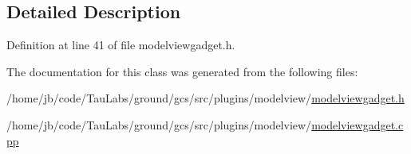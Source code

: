 \subsection{\-Detailed \-Description}


\-Definition at line 41 of file modelviewgadget.\-h.



\-The documentation for this class was generated from the following files\-:\begin{DoxyCompactItemize}
\item 
/home/jb/code/\-Tau\-Labs/ground/gcs/src/plugins/modelview/\hyperlink{modelviewgadget_8h}{modelviewgadget.\-h}\item 
/home/jb/code/\-Tau\-Labs/ground/gcs/src/plugins/modelview/\hyperlink{modelviewgadget_8cpp}{modelviewgadget.\-cpp}\end{DoxyCompactItemize}
